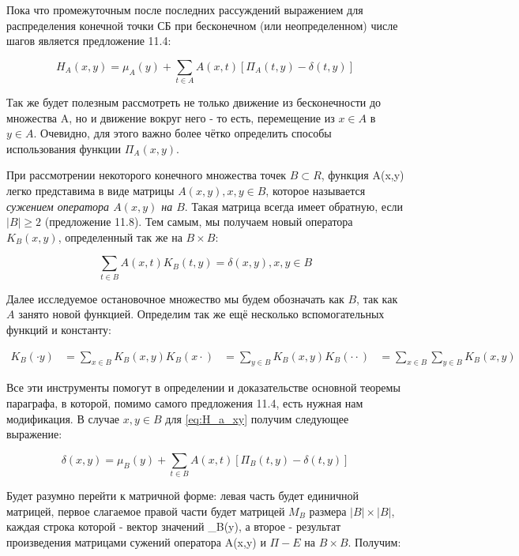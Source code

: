 Пока что промежуточным после последних рассуждений выражением для распределения конечной точки СБ при бесконечном (или неопределенном) числе шагов является предложение 11.4:

\begin{equation}
 H_A(x,y) = \mu_A(y) + \sum_{t \in A} A(x,t)[\Pi_A(t,y)-\delta(t,y)]
 \label{eq:H_a_xy}
\end{equation}

Так же будет полезным рассмотреть не только движение из бесконечности до множества A, но и движение вокруг него - то есть, перемещение 
из $x \in A$ в $y \in A$. Очевидно, для этого важно более чётко определить способы использования функции $\Pi_A(x,y)$.

При рассмотрении некоторого конечного множества точек $B \subset R$, функция A(x,y) легко представима в виде матрицы ${A(x,y)}, x,y \in B$, которое называется 
\textit{сужением оператора $A(x,y)$ на $B$}. Такая матрица всегда имеет обратную, если $|B| \geq 2$ (предложение 11.8). Тем самым, мы получаем новый оператора
$K_B(x,y)$, определенный так же на $B \times B$:

\begin{equation}
 \sum_{t \in B} A(x,t) K_B(t,y) = \delta(x,y), x,y \in B
\label{eq:K_B} 
\end{equation}

Далее исследуемое остановочное множество мы будем обозначать как $B$, так как $A$ занято новой функцией.
Определим так же ещё несколько вспомогательных функций и константу:

\begin{align*} 
K_B(\cdot y) &= \sum_{x \in B} K_B(x,y)
K_B(x \cdot) &= \sum_{y \in B} K_B(x,y)
K_B(\cdot \cdot) &= \sum_{x \in B} \sum_{y \in B} K_B(x,y)
\end{align*}

Все эти инструменты помогут в определении и доказательстве основной теоремы параграфа, в которой, помимо самого предложения 11.4, есть нужная нам модификация.
В случае $x,y \in B$ для \ref{eq:H_a_xy} получим следующее выражение:

\[ \delta(x,y) = \mu_B(y) + \sum_{t \in B} A(x,t)[\Pi_B(t,y)-\delta(t,y)] \] 

Будет разумно перейти к матричной форме: левая часть будет единичной матрицей, первое слагаемое правой части будет матрицей $M_B$ размера $|B| \times |B|$, 
каждая строка которой - вектор значений \mu_B(y), а второе - результат произведения матрицами сужений оператора A(x,y) и $\Pi - E$ на $B \times B$. Получим:

